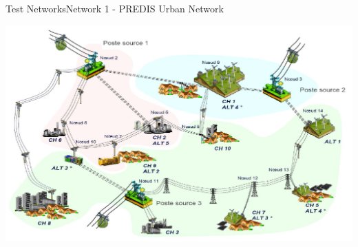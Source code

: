 \documentclass[xcolor=svgnames,aspectratio=32,8pt]{beamer}
\begin{document}
\begin{frame}
{Test Networks}{Network 1 - PREDIS Urban Network}

  \vspace{0.5cm}
  \begin{changemargin}{-0.8cm}{-1cm}

    \begin{minipage}[!h]{0.55\paperwidth}

      \centering
      \includegraphics[width=0.55\paperwidth]{NwImages/PredisG.png}

    \end{minipage}%
    \begin{minipage}[!h]{0.45\paperwidth}


\end{minipage}
\end{changemargin}
\end{frame}
\end{document}
